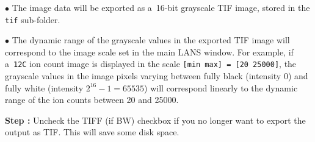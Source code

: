 \documentclass[a4paper, 11pt]{article}
\newcommand{\ttt}[1]{\texttt{#1}}
\newcommand{\lans}[1]{{\color{magenta}#1}}
\newcommand{\lanscb}[1]{{\color{darkgreen}#1}}
\newcommand{\lanstf}[1]{{\color{cyan}#1}}
\newcommand\addon[1]{-- {\small #1}}
\newcounter{step}
\newcommand\s{\addtocounter{step}{1}\vskip5pt\noindent\textbf{Step \thestep:}{ }}
\newcommand\bul{\vskip5pt\noindent$\bullet${ }}
\begin{document}
\bul The image data will be exported as a~16-bit grayscale TIF image, stored in the \ttt{tif} sub-folder. 

\bul The dynamic range of the grayscale values in the exported TIF image will correspond to the image \lanstf{scale} set in the main LANS window. For example, if a~\ttt{12C} ion count image is displayed in the scale \ttt{[min max] = [20 25000]}, the grayscale values in the image pixels varying between fully black (intensity 0) and fully white (intensity $2^{16}-1=65535$) will correspond linearly to the dynamic range of the ion counts between 20 and 25000. 

\s Uncheck the \lanscb{TIFF (if BW)} checkbox if you no longer want to export the output as TIF. This will save some disk space.


\end{document}
